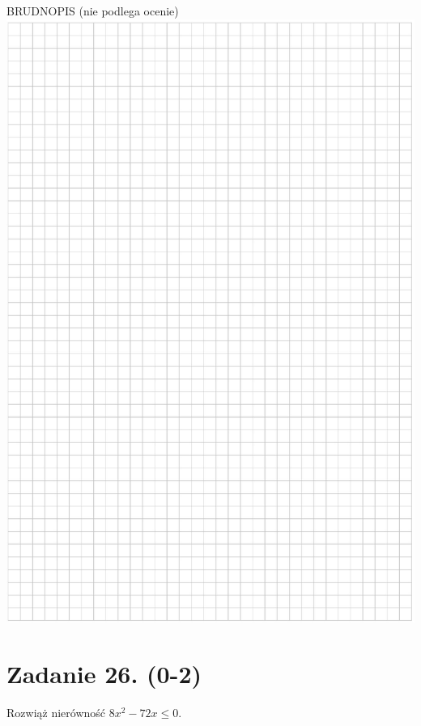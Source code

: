 \documentclass[10pt]{article}
\begin{document}
BRUDNOPIS (nie podlega ocenie)\\
\includegraphics[max width=\textwidth, center]{2024_11_21_7b5527312ea89ae66fd0g-15}

\section*{Zadanie 26. (0-2)}
Rozwiąż nierówność \(8 x^{2}-72 x \leq 0\).
\end{document}
